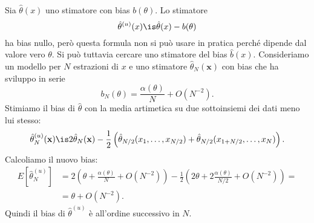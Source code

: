Sia $\hat\theta(x)$ uno stimatore con bias $b(\theta)$.
Lo stimatore
\begin{equation*}
	\hat\theta^{(u)}(x)
	\is \hat\theta(x) - b(\theta)
\end{equation*}
ha bias nullo,
però questa formula non si può usare in pratica perché dipende dal valore vero $\theta$.
Si può tuttavia cercare uno stimatore del bias $\hat b(x)$.
Consideriamo un modello per $N$ estrazioni di $x$
e uno stimatore $\hat\theta_N(\mathbf x)$
con bias che ha sviluppo in serie
\begin{equation*}
	b_N(\theta)
	= \frac{\alpha(\theta)}N + O(N^{-2}).
\end{equation*}
Stimiamo il bias di $\hat\theta$ con la media artimetica su due sottoinsiemi dei dati meno lui stesso:
\begin{equation*}
	\hat\theta^{(u)}_N(\mathbf x)
	\is 2\hat\theta_N(\mathbf x)
	- \frac12 \left( \hat\theta_{N/2}(x_1,\dots,x_{N/2}) + \hat\theta_{N/2}(x_{1+N/2},\dots,x_N) \right).
\end{equation*}
Calcoliamo il nuovo bias:
\begin{align*}
	E[\hat\theta^{(u)}_N]
	&= 2 \left( \theta + \frac{\alpha(\theta)}N + O(N^{-2}) \right)
	- \frac12 \left( 2\theta + 2 \frac{\alpha(\theta)}{N/2} + O(N^{-2}) \right) = \\
	&= \theta + O(N^{-2}).
\end{align*}
Quindi il bias di $\hat\theta^{(u)}$ è all'ordine successivo in $N$.
